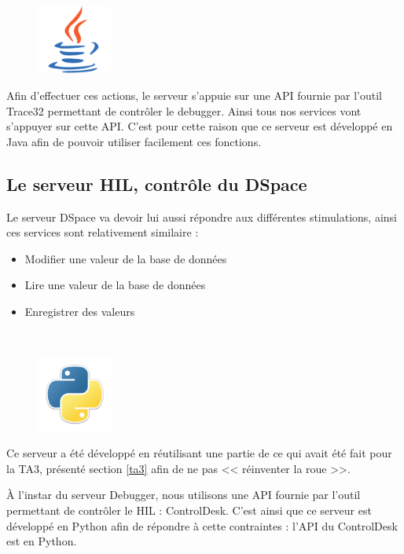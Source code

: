 \begin{figure}
	\vspace{-40px}
	\includegraphics[width=2.5cm]{contents/images/logoJava.png}
\end{figure}
Afin d'effectuer ces actions, le serveur s'appuie sur une API fournie par l'outil Trace32 permettant de contrôler le debugger. Ainsi tous nos services vont s'appuyer sur cette API. C'est pour cette raison que ce serveur est développé en Java afin de pouvoir utiliser
facilement ces fonctions.

\subsection{Le serveur HIL, contrôle du DSpace}
Le serveur DSpace va devoir lui aussi répondre aux différentes stimulations, ainsi ces services sont relativement similaire : 
\begin{itemize}
	\item Modifier une valeur de la base de données
	\item Lire une valeur de la base de données
	\item Enregistrer des valeurs
\end{itemize}~

\begin{figure}
	\includegraphics[width=2.5cm]{contents/images/python.png}
\end{figure}
Ce serveur a été développé en réutilisant une partie de ce qui avait été fait pour la TA3, présenté section \ref{ta3} afin de ne pas
<< réinventer la roue >>. 

À l'instar du serveur Debugger, nous utilisons une API fournie par l'outil permettant de contrôler le HIL : ControlDesk. 
C'est ainsi que ce serveur est développé en Python afin de répondre à cette contraintes : l'API du ControlDesk est en Python.


